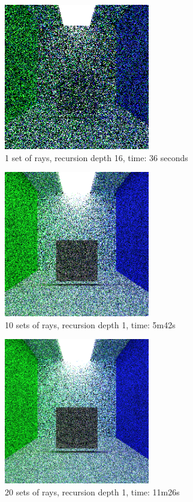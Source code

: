 \documentclass[journal]{IEEEtran}
\begin{document}
\begin{figure}[!t]

\centering
\includegraphics[width=2.5in]{1s_16d_36s}
\caption{1 set of rays, recursion depth 16, time: 36 seconds}
\label{1s_16d_36s}

\end{figure}

\begin{figure}[!t]

\centering
\includegraphics[width=2.5in]{10s_1d_5m42s}
\caption{10 sets of rays, recursion depth 1, time: 5m42s}
\label{10s_1d_5m42s}

\end{figure}

\begin{figure}[!t]

\centering
\includegraphics[width=2.5in]{20s_1d_11m26s}
\caption{20 sets of rays, recursion depth 1, time: 11m26s}
\label{20s_1d_11m26s}

\end{figure}
\end{document}
